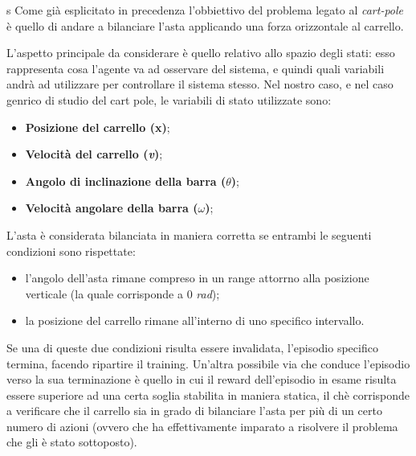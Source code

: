 s
Come già esplicitato in precedenza l'obbiettivo del problema legato al \textit{cart-pole} è quello di andare a bilanciare l'asta applicando una forza orizzontale al carrello. 

L'aspetto principale da considerare è quello relativo allo spazio degli stati: esso rappresenta cosa l'agente va ad osservare del sistema, e quindi quali variabili andrà ad utilizzare per controllare il sistema stesso. Nel nostro caso, e nel caso genrico di studio del cart pole, le variabili di stato utilizzate sono:
\begin{itemize}
	\item \textbf{Posizione del carrello (x)};
	\item \textbf{Velocità del carrello (\textit{v})};
	\item \textbf{Angolo di inclinazione della barra ($\theta$)};
	\item \textbf{Velocità angolare della barra ($\omega$)};
\end{itemize}

L'asta è considerata bilanciata in maniera corretta se entrambi le seguenti condizioni sono rispettate:
\begin{itemize}
	\item l'angolo dell'asta rimane compreso in un range attorrno alla posizione verticale (la quale corrisponde a 0 \textit{rad});
	\item la posizione del carrello rimane all'interno di uno specifico intervallo.
\end{itemize}
Se una di queste due condizioni risulta essere invalidata, l'episodio specifico termina, facendo ripartire il training. Un'altra possibile via che conduce l'episodio verso la sua terminazione è quello in cui il reward dell'episodio in esame risulta essere superiore ad una certa soglia stabilita in maniera statica, il chè corrisponde a verificare che il carrello sia in grado di bilanciare l'asta per più di un certo numero di azioni (ovvero che ha effettivamente imparato a risolvere il problema che gli è stato sottoposto).

